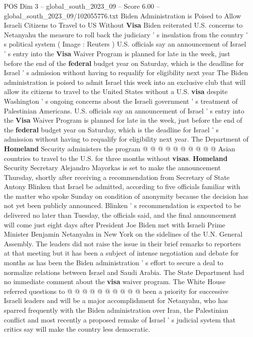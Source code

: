 \begin{textsample}{POS Dim 3 – global\_south\_2023\_09 – Score 6.00 – global\_south\_2023\_09/102055776.txt}  \label{ex:f3_pos_121}
Biden Administration is Poised to Allow Israeli Citizens to Travel to US Without \textbf{Visa} Biden reiterated U.S. concerns to Netanyahu the measure to roll back the judiciary ' s insulation from the country ' s political system ( Image : Reuters ) U.S. officials say an announcement of Israel ' s entry into the \textbf{Visa} Waiver Program is planned for late in the week, just before the end of the \textbf{federal} budget year on Saturday, which is the deadline for Israel ' s admission without having to requalify for eligibility next year The Biden administration is poised to admit Israel this week into an exclusive club that will allow its citizens to travel to the United States without a U.S. \textbf{visa} despite Washington ' s ongoing concerns about the Israeli government ' s treatment of Palestinian Americans.
U.S. officials say an announcement of Israel ' s entry into the \textbf{Visa} Waiver Program is planned for late in the week, just before the end of the \textbf{federal} budget year on Saturday, which is the deadline for Israel ' s admission without having to requalify for eligibility next year.
The Department of \textbf{Homeland} Security administers the program @ @ @ @ @ @ @ @ @ @ Asian countries to travel to the U.S. for three months without \textbf{visas}. \textbf{Homeland} Security Secretary Alejandro Mayorkas is set to make the announcement Thursday, shortly after receiving a recommendation from Secretary of State Antony Blinken that Israel be admitted, according to five officials familiar with the matter who spoke Sunday on condition of anonymity because the decision has not yet been publicly announced.
Blinken ' s recommendation is expected to be delivered no later than Tuesday, the officials said, and the final announcement will come just eight days after President Joe Biden met with Israeli Prime Minister Benjamin Netanyahu in New York on the sidelines of the U.N.
General Assembly.
The leaders did not raise the issue in their brief remarks to reporters at that meeting but it has been a subject of intense negotiation and debate for months as has been the Biden administration ' s effort to secure a deal to normalize relations between Israel and Saudi Arabia.
The State Department had no immediate comment about the \textbf{visa} waiver program.
The White House referred questions to @ @ @ @ @ @ @ @ @ @ been a priority for successive Israeli leaders and will be a major accomplishment for Netanyahu, who has sparred frequently with the Biden administration over Iran, the Palestinian conflict and most recently a proposed remake of Israel ' s judicial system that critics say will make the country less democratic.

\end{textsample}
